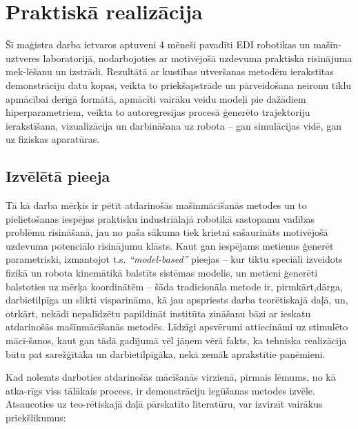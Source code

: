 \documentclass[12pt, a4paper]{article}
\numberwithin{equation}{section} %
\begin{document}
%
%
%
%
%
%
%
%
%
%
%
%
%
%
%
%
%
%
%

\newpage
\section{Praktiskā realizācija}

Šī maģistra darba ietvaros aptuveni 4 mēneši pavadīti EDI robotikas un mašīn-uztveres laboratorijā, nodarbojoties ar motivējošā uzdevuma praktiska risinājuma mek-lēšanu un izstrādi. Rezultātā ar kustības utveršanas metodēm ierakstītas demonstrāciju datu kopas, veikta to priekšapstrāde un pārveidošana neironu tīklu apmācībai derīgā formātā, apmācīti vairāku veidu modeļi pie dažādiem hiperparametriem, veikta to autoregresijas procesā ģenerēto trajektoriju ierakstīšana, vizualizācija un darbināšana uz robota -- gan simulācijas vidē, gan uz fiziskas aparatūras.

\subsection{Izvēlētā pieeja}

Tā kā darba mērķis ir pētīt atdarinošās mašīnmācīšanās metodes un to pielietošanas iespējas praktisku industriālajā robotikā sastopamu vadības problēmu risināšanā, jau no paša sākuma tiek krietni sašaurināts motivējošā uzdevuma potenciālo risinājumu klāsts. Kaut gan iespējams metienus ģenerēt parametriski, izmantojot t.s. \textit{``model-based''} pieejas -- kur tiktu speciāli izveidots fizikā un robota kinemātikā balstīts sistēmas modelis, un metieni ģenerēti balstoties uz mērķa koordinātēm -- šāda tradicionāla metode ir, pirmkārt,dārga, darbietilpīga un slikti visparināma, kā jau apspriests darba teorētiskajā daļā, un, otrkārt, nekādi nepalīdzētu papildināt institūta zināšanu bāzi ar ieskatu atdarinošās mašīnmācīšanās metodēs. Līdzīgi apsvērumi attiecināmi uz stimulēto mācī-šanos, kaut gan tādā gadījumā vēl jāņem vērā fakts, ka tehniska realizācija būtu pat sarežģītāka un darbietilpīgāka, nekā zemāk aprakstītie paņēmieni.

Kad nolemts darboties atdarinošās mācīšanās virzienā, pirmais lēmums, no kā atka-rīgs viss tālākais process, ir demonstrāciju iegūšanas metodes izvēle. Atsaucoties uz teo-rētiskajā daļā pārskatīto literatūru, var izvirzīt vairākus priekšlikumus:
\end{document}

